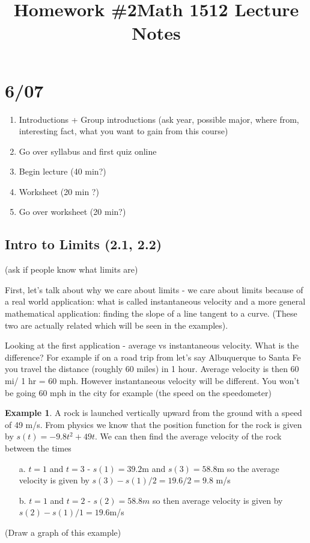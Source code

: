 \documentclass[12pt,reqno]{article}
\title{Homework \#2}
\theoremstyle{definition}
\newtheorem*{Example}{Example}
\begin{document}
\title{Math 1512 Lecture Notes}


\section{6/07}

\begin{enumerate}
	\item Introductions + Group introductions (ask year, possible major, where from, interesting fact, what you want to gain from this course) 
	\item Go over syllabus and first quiz online
	\item Begin lecture (40 min?)
	\item Worksheet (20 min ?)
	\item Go over worksheet (20 min?)
\end{enumerate}

\subsection{Intro to Limits (2.1, 2.2)} 

(ask if people know what limits are)

First, let's talk about why we care about limits - we care about limits because of a real world application: what is called instantaneous velocity and a more general mathematical application: finding the slope of a line tangent to a curve. (These two are actually related which will be seen in the examples). 

Looking at the first application - average vs instantaneous velocity. What is the difference? For example if on a road trip from let's say Albuquerque to Santa Fe you travel the distance (roughly 60 miles) in 1 hour. Average velocity is then 60 mi/ 1 hr = 60 mph. However instantaneous velocity will be different. You won't be going 60 mph in the city for example (the speed on the speedometer) 

\begin{Example}
	A rock is launched vertically upward from the ground with a speed of 49 m/s. From physics we know that the position function for the rock is given by $s(t) = -9.8t^2 + 49 t$. We can then find the average velocity of the rock between the times
	\begin{enumerate}
		\item[a.] $t = 1$ and $t = 3$ - 
			$s(1) = 39.2$m  and $s(3) = 58.8$m so the average velocity is given by $s(3)- s(1)/ 2 = 19.6/2 = 9.8 $ m/s
		\item[b.] $t = 1$ and $t = 2$ - 
			$s(2) = 58.8 m$ so then average velocity is given by $s(2) - s(1)/1 = 19.6$m/s
	\end{enumerate}



	(Draw a graph of this example) 
\end{Example}
\end{document}

